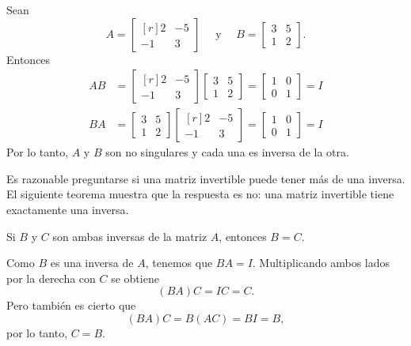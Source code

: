 \begin{examplebox}{}{}
    Sean
    $$A = \begin{bmatrix*}[r]
        2 & -5 \\
        -1 & 3
    \end{bmatrix*} \quad \text{ y } \quad B = \begin{bmatrix}
        3 & 5 \\
        1 & 2
    \end{bmatrix}.$$
    Entonces
    \begin{align*}
        AB & = \begin{bmatrix*}[r]
            2 & -5 \\
            -1 & 3
        \end{bmatrix*} \begin{bmatrix}
            3 & 5 \\
            1 & 2
        \end{bmatrix} = \begin{bmatrix}
            1 & 0 \\
            0 & 1
        \end{bmatrix} = I \\
        BA & = \begin{bmatrix}
            3 & 5 \\
            1 & 2
        \end{bmatrix} \begin{bmatrix*}[r]
            2 & -5 \\
            -1 & 3
        \end{bmatrix*} = \begin{bmatrix}
            1 & 0 \\
            0 & 1
        \end{bmatrix} = I
    \end{align*}
    Por lo tanto, $A$ y $B$ son no singulares y cada una es inversa de la otra.
\end{examplebox}

Es razonable preguntarse si una matriz invertible puede tener más de una inversa. El siguiente teorema muestra que la respuesta es no: una matriz invertible tiene exactamente una inversa.

\begin{theorem}{}{}
    Si $B$ y $C$ son ambas inversas de la matriz $A$, entonces $B = C$.

    \tcblower
    \demostracion Como $B$ es una inversa de $A$, tenemos que $BA = I$. Multiplicando ambos lados por la derecha con $C$ se obtiene
    $$(BA)C = IC = C.$$
    Pero también es cierto que
    $$(BA)C = B(AC) = BI = B,$$
    por lo tanto, $C = B$.
\end{theorem}

